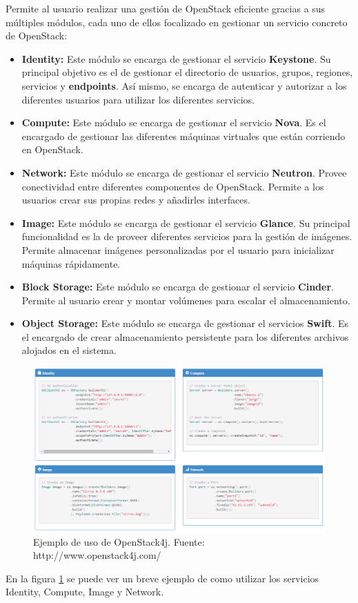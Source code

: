 Permite al usuario realizar una gestión de OpenStack eficiente gracias a sus múltiples módulos, cada uno de ellos focalizado en gestionar un servicio concreto de OpenStack:

\begin{itemize}
	\item \textbf{Identity:} Este módulo se encarga de gestionar el servicio \textbf{Keystone}. Su principal objetivo es el de gestionar el directorio de usuarios, grupos, regiones, servicios y \textbf{endpoints}. Así mismo, se encarga de autenticar y autorizar a los diferentes usuarios para utilizar los diferentes servicios.
	
	\item \textbf{Compute:} Este módulo se encarga de gestionar el servicio \textbf{Nova}. Es el encargado de gestionar las diferentes máquinas virtuales que están corriendo en OpenStack.
	
	\item \textbf{Network:} Este módulo se encarga de gestionar el servicio \textbf{Neutron}. Provee conectividad entre diferentes componentes de OpenStack. Permite a los usuarios crear sus propias redes y añadirles interfaces.
	
	\item \textbf{Image:} Este módulo se encarga de gestionar el servicio \textbf{Glance}. Su principal funcionalidad es la de proveer diferentes servicios para la gestión de imágenes. Permite almacenar imágenes personalizadas por el usuario para inicializar máquinas rápidamente.
	
	\item \textbf{Block Storage:} Este módulo se encarga de gestionar el servicio \textbf{Cinder}. Permite al usuario crear y montar volúmenes para escalar el almacenamiento.
	
	\item \textbf{Object Storage:} Este módulo se encarga de gestionar el servicios \textbf{Swift}. Es el encargado de crear almacenamiento persistente para los diferentes archivos alojados en el sistema.
\end{itemize}


\begin{figure}[!ht]
	\centering
	\includegraphics[width=0.8\linewidth]{imagenes/ejemplo_os4j}
	\caption{Ejemplo de uso de OpenStack4j. Fuente: http://www.openstack4j.com/}
	\label{fig:ejemploos4j}
\end{figure}

En la figura \ref{fig:ejemploos4j} se puede ver un breve ejemplo de como utilizar los servicios Identity, Compute, Image y Network.




\cleardoublepage
